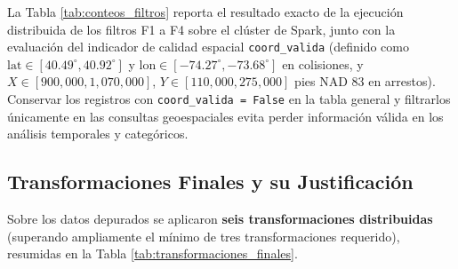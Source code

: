 La Tabla \ref{tab:conteos_filtros} reporta el resultado exacto de la ejecución distribuida de los filtros F1 a F4 sobre el clúster de Spark, junto con la evaluación del indicador de calidad espacial \texttt{coord\_valida} (definido como $\text{lat} \in [40.49^\circ, 40.92^\circ]$ y $\text{lon} \in [-74.27^\circ, -73.68^\circ]$ en colisiones, y $X \in [900{,}000, 1{,}070{,}000]$, $Y \in [110{,}000, 275{,}000]$ pies NAD 83 en arrestos). Conservar los registros con \texttt{coord\_valida = False} en la tabla general y filtrarlos únicamente en las consultas geoespaciales evita perder información válida en los análisis temporales y categóricos.

\begin{table}[H]
\centering
\scriptsize
\renewcommand{\arraystretch}{1.2}
\caption{Conteo de registros antes y después de los filtros de integridad y validación espacial en Spark.}
\label{tab:conteos_filtros}
\end{table}

\subsection{Transformaciones Finales y su Justificación}
\label{subsec:limpieza_datos}

Sobre los datos depurados se aplicaron \textbf{seis transformaciones distribuidas} (superando ampliamente el mínimo de tres transformaciones requerido), resumidas en la Tabla \ref{tab:transformaciones_finales}.

